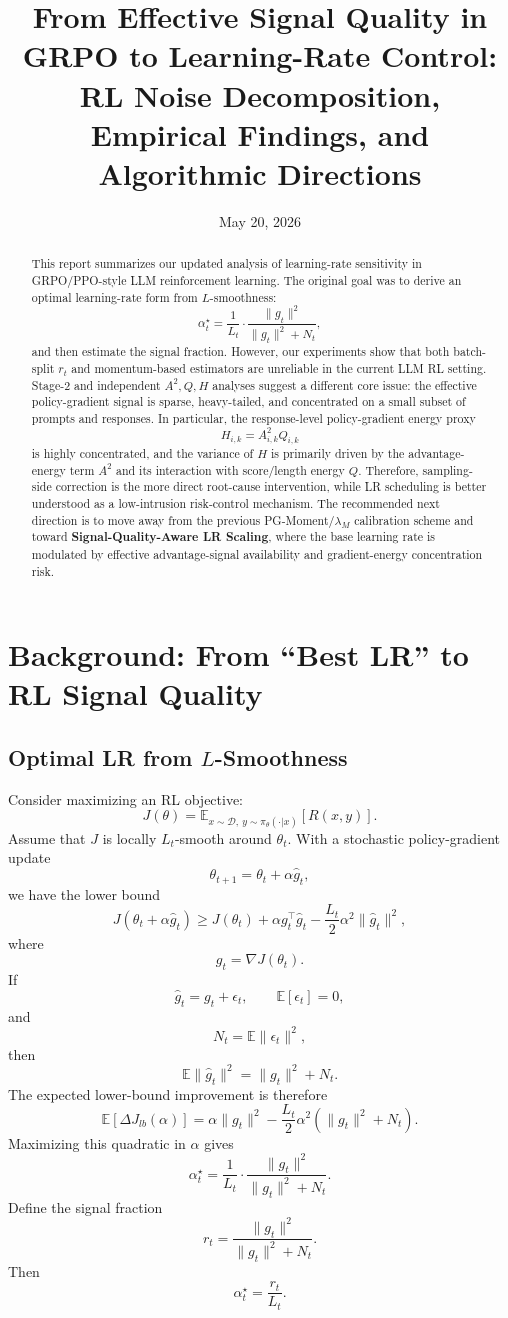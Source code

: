 \documentclass[11pt,a4paper]{article}
\title{\textbf{From Effective Signal Quality in GRPO to Learning-Rate Control:\\
RL Noise Decomposition, Empirical Findings, and Algorithmic Directions}}
\author{}
\date{May 20, 2026}
\newcommand{\E}{\mathbb{E}}
\begin{document}
\maketitle

\begin{abstract}
This report summarizes our updated analysis of learning-rate sensitivity in GRPO/PPO-style LLM reinforcement learning. The original goal was to derive an optimal learning-rate form from \(L\)-smoothness:
\[
\alpha_t^\star
=
\frac{1}{L_t}
\cdot
\frac{\|g_t\|^2}{\|g_t\|^2+N_t},
\]
and then estimate the signal fraction. However, our experiments show that both batch-split \(r_t\) and momentum-based estimators are unreliable in the current LLM RL setting. Stage-2 and independent \(A^2,Q,H\) analyses suggest a different core issue: the effective policy-gradient signal is sparse, heavy-tailed, and concentrated on a small subset of prompts and responses. In particular, the response-level policy-gradient energy proxy
\[
H_{i,k}=A_{i,k}^2Q_{i,k}
\]
is highly concentrated, and the variance of \(H\) is primarily driven by the advantage-energy term \(A^2\) and its interaction with score/length energy \(Q\). Therefore, sampling-side correction is the more direct root-cause intervention, while LR scheduling is better understood as a low-intrusion risk-control mechanism. The recommended next direction is to move away from the previous PG-Moment/\(\lambda_M\) calibration scheme and toward \textbf{Signal-Quality-Aware LR Scaling}, where the base learning rate is modulated by effective advantage-signal availability and gradient-energy concentration risk.
\end{abstract}

\tableofcontents
\newpage

\section{Background: From ``Best LR'' to RL Signal Quality}

\subsection{Optimal LR from \(L\)-Smoothness}

Consider maximizing an RL objective:
\[
J(\theta)
=
\E_{x\sim \mathcal D,\ y\sim \pi_\theta(\cdot|x)}
\left[R(x,y)\right].
\]
Assume that \(J\) is locally \(L_t\)-smooth around \(\theta_t\). With a stochastic policy-gradient update
\[
\theta_{t+1}=\theta_t+\alpha \hat g_t,
\]
we have the lower bound
\[
J(\theta_t+\alpha \hat g_t)
\ge
J(\theta_t)
+
\alpha g_t^\top \hat g_t
-
\frac{L_t}{2}\alpha^2\|\hat g_t\|^2,
\]
where
\[
g_t=\nabla J(\theta_t).
\]
If
\[
\hat g_t = g_t+\epsilon_t,\qquad \E[\epsilon_t]=0,
\]
and
\[
N_t=\E\|\epsilon_t\|^2,
\]
then
\[
\E\|\hat g_t\|^2=\|g_t\|^2+N_t.
\]
The expected lower-bound improvement is therefore
\[
\E[\Delta J_{lb}(\alpha)]
=
\alpha \|g_t\|^2
-
\frac{L_t}{2}\alpha^2(\|g_t\|^2+N_t).
\]
Maximizing this quadratic in \(\alpha\) gives
\[
\alpha_t^\star
=
\frac{1}{L_t}
\cdot
\frac{\|g_t\|^2}{\|g_t\|^2+N_t}.
\]
Define the signal fraction
\[
r_t
=
\frac{\|g_t\|^2}{\|g_t\|^2+N_t}.
\]
Then
\[
\alpha_t^\star=\frac{r_t}{L_t}.
\]
\end{document}
